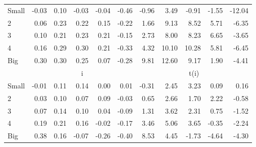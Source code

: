 \begin{table}[!ht]
\begin{tabular}{lrrrrrrrrrr}
    \\
      \cmidrule(r){2-6} \cmidrule(r){7-11}

    Small   & -0.03  & 0.10  & -0.03  & -0.04  & -0.46  & -0.96  & 3.49  & -0.91  & -1.55  & -12.04  \\
         2  & 0.06  & 0.23  & 0.22  & 0.15  & -0.22  & 1.66  & 9.13  & 8.52  & 5.71  & -6.35  \\
         3  & 0.10  & 0.21  & 0.23  & 0.21  & -0.15  & 2.73  & 8.00  & 8.23  & 6.65  & -3.65  \\
         4  & 0.16  & 0.29  & 0.30  & 0.21  & -0.33  & 4.32  & 10.10  & 10.28  & 5.81  & -6.45  \\
    Big     & 0.30  & 0.30  & 0.25  & 0.07  & -0.28  & 9.81  & 12.60  & 9.17  & 1.90  & -4.41  \\

  
    
      & \multicolumn{5}{c}{i} & \multicolumn{5}{c}{t(i)}
    
    \\
      \cmidrule(r){2-6} \cmidrule(r){7-11}

    Small   & -0.01  & 0.11  & 0.14  & 0.00  & 0.01  & -0.31  & 2.45  & 3.23  & 0.09  & 0.16  \\
         2  & 0.03  & 0.10  & 0.07  & 0.09  & -0.03  & 0.65  & 2.66  & 1.70  & 2.22  & -0.58  \\
         3  & 0.07  & 0.14  & 0.10  & 0.04  & -0.09  & 1.31  & 3.62  & 2.31  & 0.75  & -1.52  \\
         4  & 0.19  & 0.21  & 0.16  & -0.02  & -0.17  & 3.46  & 5.06  & 3.65  & -0.35  & -2.24  \\
    Big     & 0.38  & 0.16  & -0.07  & -0.26  & -0.40  & 8.53  & 4.45  & -1.73  & -4.64  & -4.30  \\

  

  \bottomrule
\end{tabular}
\label{tbl:25_Size_Beta_F15}
\end{table}